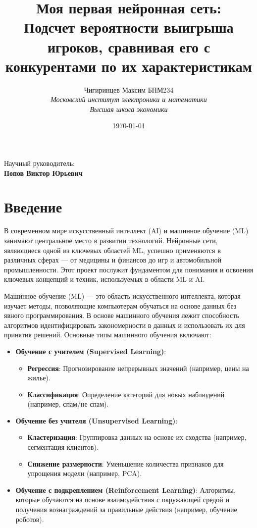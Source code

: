 \documentclass[12pt,a4paper]{article}
\title{Моя первая нейронная сеть: \\ \large Подсчет вероятности выигрыша игроков, сравнивая его с конкурентами по их характеристикам}
\author{Чигиринцев Максим БПМ234 \\ \textit{Московский институт электроники и математики} \\ \textit{Высшая школа экономики}}
\date{\today}
\begin{document}
\maketitle
\begin{center}
    Научный руководитель: \\
    \textbf{Попов Виктор Юрьевич}
\end{center}

\thispagestyle{empty}
\newpage

\tableofcontents


\newpage
\section{Введение}
В современном мире искусственный интеллект (AI) и машинное обучение (ML) занимают центральное место в развитии технологий. Нейронные сети, являющиеся одной из ключевых областей ML, успешно применяются в различных сферах — от медицины и финансов до игр и автомобильной промышленности. Этот проект послужит фундаментом для понимания и освоения ключевых концепций и техник, используемых в области ML и AI.

Машинное обучение (ML) — это область искусственного интеллекта, которая изучает методы, позволяющие компьютерам обучаться на основе данных без явного программирования. В основе машинного обучения лежит способность алгоритмов идентифицировать закономерности в данных и использовать их для принятия решений. Основные типы машинного обучения включают:
\begin{itemize}
    \item \textbf{Обучение с учителем (Supervised Learning)}:
    \begin{itemize}
        \item \textbf{Регрессия}: Прогнозирование непрерывных значений (например, цены на жилье).
        \item \textbf{Классификация}: Определение категорий для новых наблюдений (например, спам/не спам).
    \end{itemize}
    \item \textbf{Обучение без учителя (Unsupervised Learning)}:
    \begin{itemize}
        \item \textbf{Кластеризация}: Группировка данных на основе их сходства (например, сегментация клиентов).
        \item \textbf{Снижение размерности}: Уменьшение количества признаков для упрощения модели (например, PCA).
    \end{itemize}
    \item \textbf{Обучение с подкреплением (Reinforcement Learning)}: Алгоритмы, которые обучаются на основе взаимодействия с окружающей средой и получения вознаграждений за правильные действия (например, обучение роботов).
\end{itemize}
    
\end{document}
